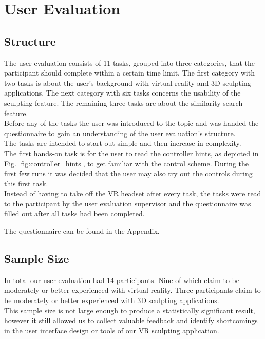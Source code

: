 \section{User Evaluation}

\subsection{Structure}

The user evaluation consists of 11 tasks, grouped into three categories, that the participant should complete within a certain time limit. The first category with two tasks is about the user's background with virtual reality and 3D sculpting applications. The next category with six tasks concerns the usability of the sculpting feature. The remaining three tasks are about the similarity search feature.\\
Before any of the tasks the user was introduced to the topic and was handed the questionnaire to gain an understanding of the user evaluation's structure.\\
The tasks are intended to start out simple and then increase in complexity.\\
The first hands-on task is for the user to read the controller hints, as depicted in Fig. \ref{fig:controller_hints}, to get familiar with the control scheme. During the first few runs it was decided that the user may also try out the controls during this first task.\\
Instead of having to take off the VR headset after every task, the tasks were read to the participant by the user evaluation supervisor and the questionnaire was filled out after all tasks had been completed.\\


The questionnaire can be found in the Appendix.

\subsection{Sample Size}

In total our user evaluation had 14 participants. Nine of which claim to be moderately or better experienced with virtual reality. Three participants claim to be moderately or better experienced with 3D sculpting applications.\\
This sample size is not large enough to produce a statistically significant result, however it still allowed us to collect valuable feedback and identify shortcomings in the user interface design or tools of our VR sculpting application.


